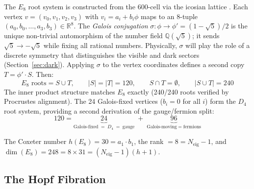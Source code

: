 \documentclass[12pt,a4paper]{article}
\theoremstyle{definition}
\begin{document}
The $E_8$ root system is constructed from the 600-cell via the icosian lattice \cite{conway1998icosian,elser1987}. Each vertex $v = (v_0, v_1, v_2, v_3)$ with $v_i = a_i + b_i\phi$ maps to an 8-tuple $(a_0, b_0, \ldots, a_3, b_3) \in \mathbb{R}^8$.  The \emph{Galois conjugation} $\sigma: \phi \to \phi' = (1-\sqrt{5})/2$ is the unique non-trivial automorphism of the number field $\mathbb{Q}(\sqrt{5})$; it sends $\sqrt{5} \to -\sqrt{5}$ while fixing all rational numbers.  Physically, $\sigma$ will play the role of a discrete symmetry that distinguishes the visible and dark sectors (Section~\ref{sec:dark}).  Applying $\sigma$ to the vertex coordinates defines a second copy $T = \phi' \cdot S$. Then:
\begin{equation}
\boxed{E_8 \text{ roots} = S \cup T, \qquad |S| = |T| = 120, \qquad S \cap T = \emptyset, \qquad |S \cup T| = 240}
\end{equation}
The inner product structure matches $E_8$ exactly (240/240 roots verified by Procrustes alignment). The 24 Galois-fixed vertices ($b_i = 0$ for all $i$) form the $D_4$ root system, providing a second derivation of the gauge/fermion split:
\begin{equation}
120 = \underbrace{24}_{\text{Galois-fixed} \;=\; D_4 \;=\; \text{gauge}} \;+\; \underbrace{96}_{\text{Galois-moving} \;=\; \text{fermions}}
\end{equation}

The Coxeter number $h(E_8) = 30 = a_1 \cdot b_1$, the rank $= 8 = N_{\text{eig}} - 1$, and $\dim(E_8) = 248 = 8 \times 31 = (N_{\text{eig}}-1)(h+1)$.



\subsection{The Hopf Fibration}
\end{document}
